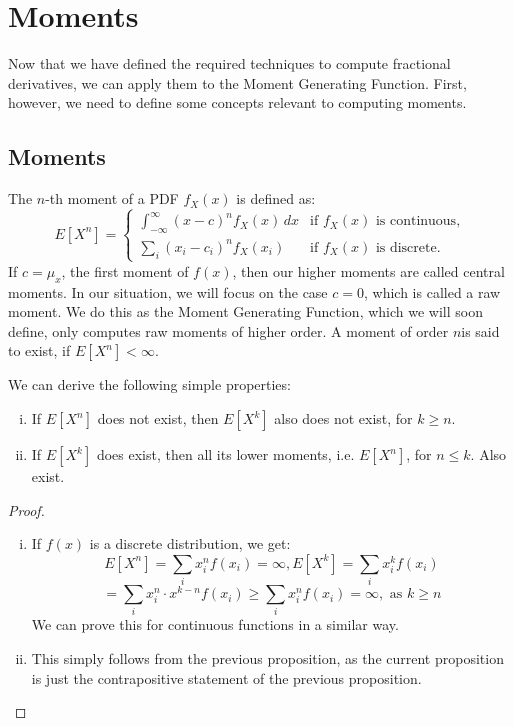 \section{Moments}\label{s: moments}
Now that we have defined the required techniques to compute fractional derivatives, we can apply them to the Moment Generating Function. First, however, we need to define some concepts relevant to computing moments.
\subsection{Moments}
\begin{definition}
    The \(n\)-th moment of a PDF \(f_X(x)\) is defined as:
   \[
E[X^n] = 
\begin{cases} 
\int_{-\infty}^{\infty} (x - c)^n f_X(x) \, dx & \text{if } f_X(x) \text{ is continuous,} \\ 
\sum_{i} (x_i - c_ i)^n f_X(x_i) & \text{if } f_X(x) \text{ is discrete.} 
\end{cases}
\]
If \(c = \mu_x\), the first moment of \(f(x)\), then our higher moments are called central moments. In our situation, we will focus on the case \(c = 0\), which is called a raw moment. We do this as the Moment Generating Function, which we will soon define, only computes raw moments of higher order. A moment of order \(n\)is said to exist, if \(E[X^n] < \infty\).
\end{definition}

\begin{proposition}\label{p: moments}
    We can derive the following simple properties:
    \begin{enumerate}[(i)]
        \item If \(E[X^n]\) does not exist, then \(E[X^k]\) also does not exist, for \( k \geq n\).
    
    \item If \(E[X^k]\) does exist, then all its lower moments, i.e. \(E[X^n]\), for \(n \leq k\). Also exist.
\end{enumerate}
\end{proposition}


\begin{proof}
     
    \begin{enumerate}[(i)]
        \item If \(f(x)\) is a discrete distribution, we get: \[E[X^n] = \sum_{i} x_i^n f(x_i) = \infty, E[X^k] = \sum_{i} x_i^k f(x_i)\]
        \[ = \sum_{i} x_i^n \cdot x^{k - n} f(x_i) \geq \sum_{i} x_i^n f(x_i) = \infty, \text{ as } k \geq n\]
        We can prove this for continuous functions in a similar way.
        \item This simply follows from the previous proposition, as the current proposition is just the contrapositive statement of the previous proposition.
    \end{enumerate}
\end{proof}

